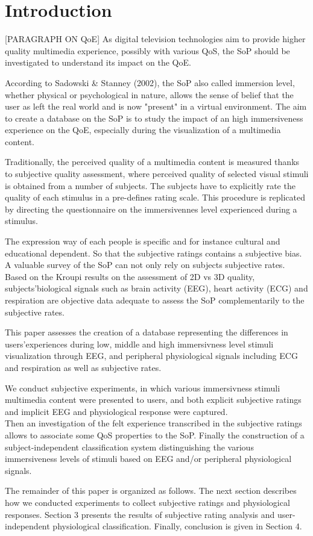 \section{Introduction}
[PARAGRAPH ON QoE]
As digital television technologies aim to provide higher quality multimedia experience, possibly with various \ac{QoS}, the \ac{SoP} should be investigated to understand its impact on the \ac{QoE}.

According to Sadowski \& Stanney (2002), the \ac{SoP} also called immersion level, whether physical or psychological in nature, allows the sense of belief that the user as left the real world and is now "present" in a virtual environment. The aim to create a database on the \ac{SoP} is to study the impact of an high immersiveness experience on the \ac{QoE}, especially during the visualization of a multimedia content.

Traditionally, the perceived quality of a multimedia content is measured thanks to subjective quality assessment, where perceived quality of selected visual stimuli is obtained from a number of subjects. The subjects have to explicitly rate the quality of each stimulus in a pre-defines rating scale. This procedure is replicated by directing the questionnaire on the immersivennes level experienced during a stimulus.

The expression way of each people is specific and for instance cultural and educational dependent. So that the subjective ratings contains a subjective bias. A valuable survey of the \ac{SoP} can not only rely on subjects subjective rates. Based on the  Kroupi results on the assessment of 2D vs 3D quality, subjects'biological signals such as brain activity (\ac{EEG}), heart activity (\ac{ECG}) and respiration are objective data adequate to assess the \ac{SoP} complementarily to the subjective rates.

This paper assesses the creation of a database representing the differences in users'experiences during low, middle and high immersivness level stimuli visualization through \ac{EEG}, and peripheral physiological signals including \ac{ECG} and respiration as well as subjective rates.

We conduct subjective experiments, in which various immersivness stimuli multimedia content were presented to users, and both explicit subjective ratings and implicit \ac{EEG} and physiological response were captured.
\\Then an investigation of the felt experience transcribed in the subjective ratings allows to associate some \ac{QoS} properties to the \ac{SoP}. Finally the construction of a subject-independent classification system distinguishing the various immersiveness levels of stimuli based on \ac{EEG} and/or peripheral physiological signals.

The remainder of this paper is organized as follows.
The next section describes how we conducted experiments to collect subjective ratings and physiological responses. Section 3 presents the results of subjective rating analysis and user-independent physiological classification. Finally, conclusion is given in Section 4.